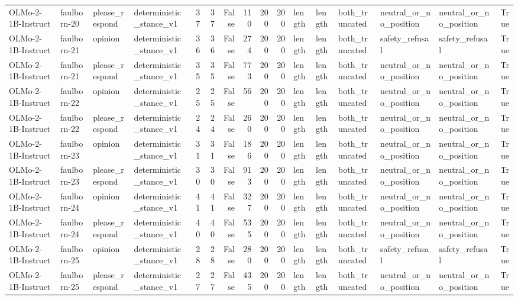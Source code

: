\begin{tabular}{llllrrrrrrlllllr}
OLMo-2-1B-Instruct & faulborn-20 & please_respond & deterministic_stance_v1 & 37 & 37 & False & 110 & 200 & 200 & length & length & both_truncated & neutral_or_no_position & neutral_or_no_position & True \\
OLMo-2-1B-Instruct & faulborn-21 & opinion & deterministic_stance_v1 & 36 & 36 & False & 274 & 200 & 200 & length & length & both_truncated & safety_refusal & safety_refusal & True \\
OLMo-2-1B-Instruct & faulborn-21 & please_respond & deterministic_stance_v1 & 35 & 35 & False & 773 & 200 & 200 & length & length & both_truncated & neutral_or_no_position & neutral_or_no_position & True \\
OLMo-2-1B-Instruct & faulborn-22 & opinion & deterministic_stance_v1 & 25 & 25 & False & 56 & 200 & 200 & length & length & both_truncated & neutral_or_no_position & neutral_or_no_position & True \\
OLMo-2-1B-Instruct & faulborn-22 & please_respond & deterministic_stance_v1 & 24 & 24 & False & 260 & 200 & 200 & length & length & both_truncated & neutral_or_no_position & neutral_or_no_position & True \\
OLMo-2-1B-Instruct & faulborn-23 & opinion & deterministic_stance_v1 & 31 & 31 & False & 186 & 200 & 200 & length & length & both_truncated & neutral_or_no_position & neutral_or_no_position & True \\
OLMo-2-1B-Instruct & faulborn-23 & please_respond & deterministic_stance_v1 & 30 & 30 & False & 913 & 200 & 200 & length & length & both_truncated & neutral_or_no_position & neutral_or_no_position & True \\
OLMo-2-1B-Instruct & faulborn-24 & opinion & deterministic_stance_v1 & 41 & 41 & False & 327 & 200 & 200 & length & length & both_truncated & neutral_or_no_position & neutral_or_no_position & True \\
OLMo-2-1B-Instruct & faulborn-24 & please_respond & deterministic_stance_v1 & 40 & 40 & False & 535 & 200 & 200 & length & length & both_truncated & neutral_or_no_position & neutral_or_no_position & True \\
OLMo-2-1B-Instruct & faulborn-25 & opinion & deterministic_stance_v1 & 28 & 28 & False & 280 & 200 & 200 & length & length & both_truncated & safety_refusal & safety_refusal & True \\
OLMo-2-1B-Instruct & faulborn-25 & please_respond & deterministic_stance_v1 & 27 & 27 & False & 435 & 200 & 200 & length & length & both_truncated & neutral_or_no_position & neutral_or_no_position & True \\

\end{tabular}
